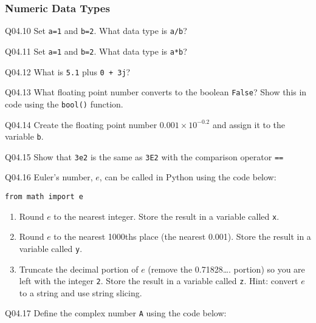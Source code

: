 \documentclass{book}
\newcommand{\passthrough}[1]{#1}
\begin{document}
    




    
        \hypertarget{numeric-data-types}{%
\subsubsection{Numeric Data Types}\label{numeric-data-types}}

Q04.10 Set \passthrough{\lstinline!a=1!} and
\passthrough{\lstinline!b=2!}. What data type is
\passthrough{\lstinline!a/b!}?

Q04.11 Set \passthrough{\lstinline!a=1!} and
\passthrough{\lstinline!b=2!}. What data type is
\passthrough{\lstinline!a*b!}?

Q04.12 What is \passthrough{\lstinline!5.1!} plus
\passthrough{\lstinline!0 + 3j!}?

Q04.13 What floating point number converts to the boolean
\passthrough{\lstinline!False!}? Show this in code using the
\passthrough{\lstinline!bool()!} function.

Q04.14 Create the floating point number \(0.001 \times 10^{-0.2}\) and
assign it to the variable \passthrough{\lstinline!b!}.

Q04.15 Show that \passthrough{\lstinline!3e2!} is the same as
\passthrough{\lstinline!3E2!} with the comparison operator
\passthrough{\lstinline!==!}

Q04.16 Euler's number, \(e\), can be called in Python using the code
below:

\begin{lstlisting}
from math import e
\end{lstlisting}

\begin{enumerate}
\def\labelenumi{(\alph{enumi})}
\item
  Round \(e\) to the nearest integer. Store the result in a variable
  called \passthrough{\lstinline!x!}.
\item
  Round \(e\) to the nearest 1000ths place (the nearest 0.001). Store
  the result in a variable called \passthrough{\lstinline!y!}.
\item
  Truncate the decimal portion of \(e\) (remove the 0.71828\ldots{}.
  portion) so you are left with the integer \passthrough{\lstinline!2!}.
  Store the result in a variable called \passthrough{\lstinline!z!}.
  Hint: convert \(e\) to a string and use string slicing.
\end{enumerate}

Q04.17 Define the complex number \passthrough{\lstinline!A!} using the
code below:
\end{document}
